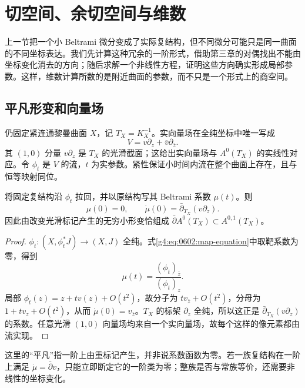 
% 
% 

\section{切空间、余切空间与维数}
\label{g4:sec:0603}

上一节把一个小 Beltrami 微分变成了实际复结构，但不同微分可能只是同一曲面的不同坐标表达。我们先计算这种冗余的一阶形式，借助第三章的对偶找出不能由坐标变化消去的方向；随后求解一个非线性方程，证明这些方向确实形成局部参数。这样，维数计算所数的是附近曲面的参数，而不只是一个形式上的商空间。

\subsection{平凡形变和向量场}
\label{g4:subsec:0603:01}

仍固定紧连通黎曼曲面 \(X\)，记 \(T_X=K_X^{-1}\)。实向量场在全纯坐标中唯一写成
\[
	V=v\partial_z+\overline v\partial_{\overline z}.
\]
其 \((1,0)\) 分量 \(v\partial_z\) 是 \(T_X\) 的光滑截面；这给出实向量场与 \(A^0(T_X)\) 的实线性对应。令 \(\phi_t\) 是 \(V\) 的流，\(t\) 为实参数。紧性保证小时间内流在整个曲面上存在，且与恒等映射同位。

\begin{proposition}\label{g4:prop:0603:trivial-deformation}
	将固定复结构沿 \(\phi_t\) 拉回，并以原结构写其 Beltrami 系数 \(\mu(t)\)。则
	\[
		\mu(0)=0,\qquad
		\dot\mu(0)=\bar\partial_{T_X}(v\partial_z).
	\]
	因此由改变光滑标记产生的无穷小形变恰组成
	\(\bar\partial A^0(T_X)\subset A^{0,1}(T_X)\)。
\end{proposition}
\begin{proof}
	\(\phi_t:(X,\phi_t^*J)\to(X,J)\) 全纯。式\eqref{g4:eq:0602:map-equation}中取靶系数为零，得到
	\[
		\mu(t)=\frac{(\phi_t)_{\overline z}}{(\phi_t)_z}.
	\]
	局部 \(\phi_t(z)=z+t v(z)+O(t^2)\)，故分子为 \(t v_{\overline z}+O(t^2)\)，分母为 \(1+t v_z+O(t^2)\)，从而 \(\dot\mu(0)=v_{\overline z}\)。\(T_X\) 的标架 \(\partial_z\) 全纯，所以这正是 \(\bar\partial_{T_X}(v\partial_z)\) 的系数。任意光滑 \((1,0)\) 向量场均来自一个实向量场，故每个这样的像元素都由流实现。
\end{proof}

这里的“平凡”指一阶上由重标记产生，并非说系数函数为零。若一族复结构在一阶上满足 \(\dot\mu=\bar\partial v\)，只能立即断定它的一阶类为零；整族是否与常族等价，还需要非线性的坐标变化。


